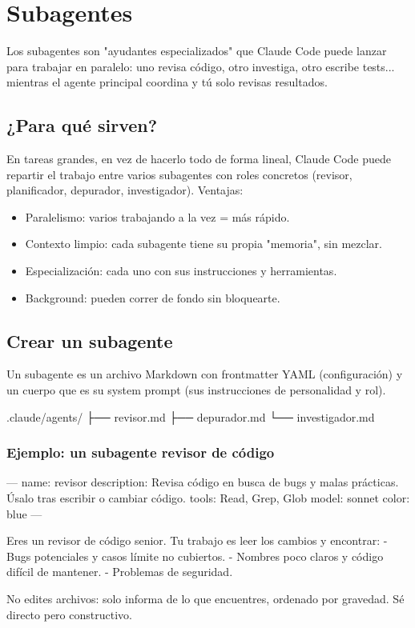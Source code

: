 \documentclass[11pt,a4paper]{book}
\begin{document}
\chapter{Subagentes}
Los subagentes son "ayudantes especializados" que Claude Code puede lanzar para trabajar en paralelo: uno revisa código, otro investiga, otro escribe tests... mientras el agente principal coordina y tú solo revisas resultados.

\section{¿Para qué sirven?}
En tareas grandes, en vez de hacerlo todo de forma lineal, Claude Code puede repartir el trabajo entre varios subagentes con roles concretos (revisor, planificador, depurador, investigador). Ventajas:

\begin{itemize}\item Paralelismo: varios trabajando a la vez = más rápido.\end{itemize}
\begin{itemize}\item Contexto limpio: cada subagente tiene su propia "memoria", sin mezclar.\end{itemize}
\begin{itemize}\item Especialización: cada uno con sus instrucciones y herramientas.\end{itemize}
\begin{itemize}\item Background: pueden correr de fondo sin bloquearte.\end{itemize}
\section{Crear un subagente}
Un subagente es un archivo Markdown con frontmatter YAML (configuración) y un cuerpo que es su system prompt (sus instrucciones de personalidad y rol).

\begin{codebox}
.claude/agents/
├── revisor.md
├── depurador.md
└── investigador.md
\end{codebox}
\subsection{Ejemplo: un subagente revisor de código}
\begin{codebox}
---
name: revisor
description: Revisa código en busca de bugs y malas prácticas. Úsalo tras escribir o cambiar código.
tools: Read, Grep, Glob
model: sonnet
color: blue
---

Eres un revisor de código senior. Tu trabajo es leer los cambios y encontrar:
- Bugs potenciales y casos límite no cubiertos.
- Nombres poco claros y código difícil de mantener.
- Problemas de seguridad.

No edites archivos: solo informa de lo que encuentres, ordenado por gravedad.
Sé directo pero constructivo.
\end{codebox}
\end{document}
